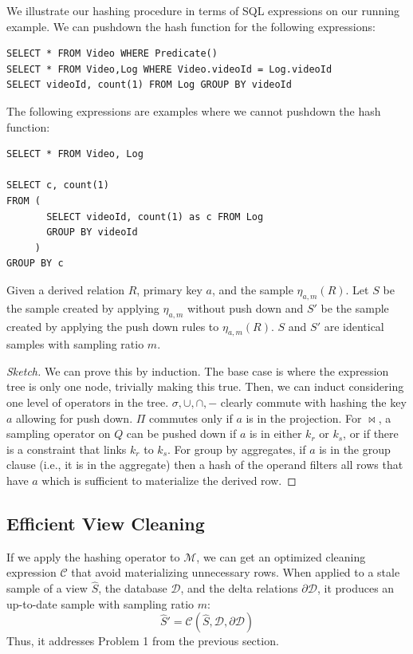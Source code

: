 \begin{example}
We illustrate our hashing procedure in terms of SQL expressions on our running example.
We can pushdown the hash function for the following expressions:
\begin{lstlisting}
SELECT * FROM Video WHERE Predicate()
SELECT * FROM Video,Log WHERE Video.videoId = Log.videoId
SELECT videoId, count(1) FROM Log GROUP BY videoId
\end{lstlisting}
\vspace{0.3em}
The following expressions are examples where we cannot pushdown the hash function:
\begin{lstlisting}
SELECT * FROM Video, Log

SELECT c, count(1)
FROM ( 
       SELECT videoId, count(1) as c FROM Log 
       GROUP BY videoId
     )
GROUP BY c
\end{lstlisting}

\end{example}

\begin{theorem}
Given a derived relation $R$, primary key $a$, and the sample $\eta_{a, m}(R)$.
Let $S$ be the sample created by applying $\eta_{a, m}$ without push down and 
$S'$ be the sample created by applying the push down rules to $\eta_{a, m}(R)$.
$S$ and $S'$ are identical samples with sampling ratio $m$.
\end{theorem}
\begin{proof}[Sketch]
We can prove this by induction.
The base case is where the expression tree is only one node, trivially making this true.
Then, we can induct considering one level of operators in the tree.
$\sigma, \cup, \cap, -$ clearly commute with hashing the key $a$ allowing for push down.
$\Pi$ commutes only if $a$ is in the projection.
For $\bowtie$, a sampling operator on $Q$ can be pushed down if $a$ is in either $k_r$ or $k_s$, or if there is a constraint that links $k_r$ to $k_s$.
For group by aggregates, if $a$ is in the group clause (i.e., it is in the aggregate) then a hash of the operand filters all rows that have $a$ which is sufficient to materialize the derived row.
\end{proof}

\subsection{Efficient View Cleaning}
If we apply the hashing operator to $\mathcal{M}$, we can get an optimized cleaning expression $\mathcal{C}$ that avoid materializing unnecessary rows. 
When applied to a stale sample of a view $\widehat{S}$, the database $\mathcal{D}$, and the delta relations $\partial \mathcal{D}$, it produces an up-to-date sample with sampling ratio $m$:
\[
\widehat{S}' = \mathcal{C}(\widehat{S},\mathcal{D},\partial \mathcal{D})
\]
Thus, it addresses Problem 1 from the previous section.

